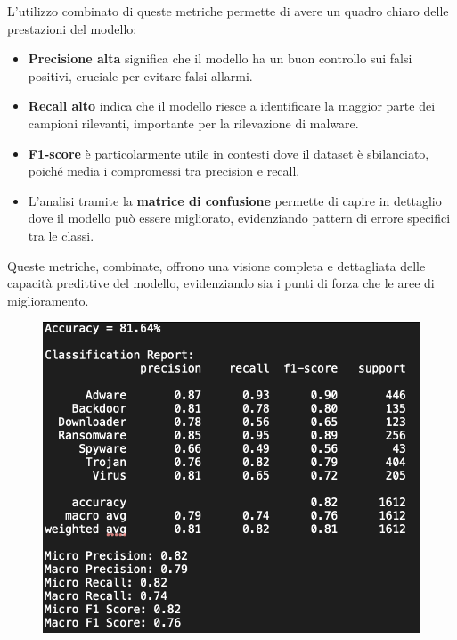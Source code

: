L'utilizzo combinato di queste metriche permette di avere un quadro chiaro delle prestazioni del modello:
\begin{itemize}
    \item \textbf{Precisione alta} significa che il modello ha un buon controllo sui falsi positivi, cruciale per evitare falsi allarmi.
    \item \textbf{Recall alto} indica che il modello riesce a identificare la maggior parte dei campioni rilevanti, importante per la rilevazione di malware.
    \item \textbf{F1-score} è particolarmente utile in contesti dove il dataset è sbilanciato, poiché media i compromessi tra precision e recall.
    \item L'analisi tramite la \textbf{matrice di confusione} permette di capire in dettaglio dove il modello può essere migliorato, evidenziando pattern di errore specifici tra le classi.
\end{itemize}
Queste metriche, combinate, offrono una visione completa e dettagliata delle capacità predittive del modello, evidenziando sia i punti di forza che le aree di miglioramento.

\begin{figure}[ht]
    \centering
        \centering
        \includegraphics[width=0.8\linewidth]{images/evaluation.png}
        \label{fig:cnn_architecture}
\end{figure}


